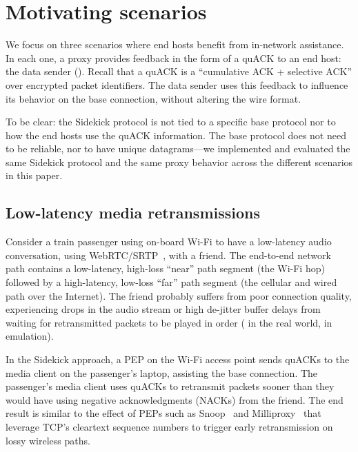 \section{Motivating scenarios}
\label{sec:sidekick:motivating}



We focus on three scenarios where end hosts benefit from in-network assistance.
In each one, a proxy provides feedback in the form of a quACK to an end
host: the data sender (). Recall that a quACK is a
``cumulative ACK + selective ACK'' over encrypted packet identifiers. The data
sender uses this feedback to influence its behavior on the base connection,
without altering the wire format.

To be clear: the Sidekick protocol is not tied to a specific base protocol
nor to how the end hosts use the quACK information. The base protocol does not
need to be reliable, nor to have unique datagrams---we implemented and evaluated
the same Sidekick protocol and the same proxy behavior across the different
scenarios in this paper.

\subsection{Low-latency media retransmissions}
\label{sec:sidekick:motivating:media}

Consider a train passenger using on-board Wi-Fi to have a low-latency audio
conversation, using WebRTC/SRTP~\cite{rfc8834webrtc}, with a friend. The
end-to-end network path contains a low-latency, high-loss ``near'' path
segment (the Wi-Fi hop) followed by a high-latency, low-loss ``far'' path
segment (the cellular and wired path over the Internet). The friend probably
suffers from poor connection quality, experiencing drops in the audio stream or
high de-jitter buffer delays from waiting for retransmitted packets to be
played in order ( in the real world,
 in emulation).

In the Sidekick approach, a PEP on the Wi-Fi access point sends quACKs to
the media client on the passenger's laptop, assisting the base connection.
The passenger's media client uses quACKs to retransmit packets sooner than they
would have using negative acknowledgments (NACKs) from the friend. The
end result is similar to the effect of PEPs such as
Snoop~\cite{balakrishnan1995snoop} and Milliproxy~\cite{polese2017milliproxy}
that leverage TCP's cleartext sequence numbers to trigger early retransmission
on lossy wireless paths.

